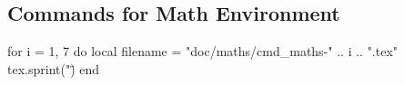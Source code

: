 \subsection{Commands for Math Environment}
\ifluatex
    \begin{luacode*}
        for i = 1, 7 do
            local filename = "doc/maths/cmd_maths-" .. i .. ".tex"
            tex.sprint("\")
        end
    \end{luacode*}    
\else
    
    
    
    
    
    
    
\fi